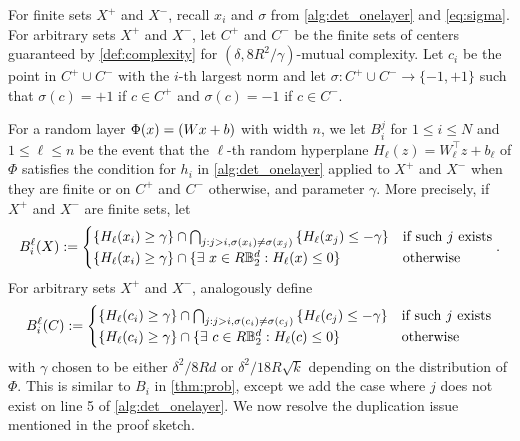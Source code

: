 \documentclass[aoap]{imsart}
\numberwithin{equation}{section}
\theoremstyle{definition}
\theoremstyle{remark}
\numberwithin{equation}{section}
\newcommand{\0}{\mathbf{0}}
\newcommand{\1}{\mathbf{1}}
\newcommand{\B}{\mathbb{B}}
\let \Re \relax
\DeclareMathOperator{\Re}{ReLU}
\numberwithin{equation}{section}
\begin{document}
For finite sets $X^+$ and $X^-$, recall $x_i$ and $\sigma$ from \cref{alg:det_onelayer} and \eqref{eq:sigma}. For arbitrary sets $X^+$ and $X^-$, let $C^{+}$ and $C^{-}$ be the finite sets of centers guaranteed by \cref{def:complexity} for  $(\delta, 8R^2/\gamma)$-mutual complexity. Let $c_{i}$ be the point in $C^{+}\cup C^{-}$ with the $i$-th largest norm and let $\sigma : C^{+}\cup C^{-}\to \lbrace -1, +1\rbrace$ such that $\sigma (c)=+1$ if $c\in C^{+}$ and $\sigma (c)=-1$ if $c\in C^{-}$.

For a random layer $\Phi(x)=\Re (Wx+b)$ with width $n$, we let $B_i^j$ for $1\leq i\leq N$ and $1\leq \ell\leq n$ be the event that the $\ell$-th random hyperplane $H_\ell(z)=W_\ell^{\intercal}z+b_\ell$ of $\Phi$ satisfies the condition for $h_i$ in \cref{alg:det_onelayer} applied to $X^+$ and $X^-$ when they are finite or on $C^+$ and $C^-$ otherwise, and parameter $\gamma$. More precisely, if $X^+$ and $X^-$ are finite sets, let
\begin{equation}\label{eq:bxil}
B^{\ell}_{i}(X):=\begin{cases}
\left\lbrace H_{\ell}(x_{i})\geq \gamma \right\rbrace\cap \bigcap_{j:j>i, \sigma(x_i) \neq\sigma(x_j)  }\left\lbrace H_{\ell}(x_{j})\leq -\gamma \right\rbrace & \textup{if such $j$ exists} \\
\left\lbrace H_{\ell}(x_{i})\geq \gamma \right\rbrace \cap \lbrace\exists \ x\in R\B_2^d: H_\ell(x)\leq 0\rbrace &\textup{otherwise}
\end{cases}.
\end{equation}
For arbitrary sets $X^+$ and $X^-$, analogously define
\begin{equation}\label{eq:bcil}
B^{\ell}_{i}(C):=\begin{cases}
\left\lbrace H_{\ell}(c_{i})\geq \gamma \right\rbrace\cap \bigcap_{j:j>i, \sigma(c_i) \neq\sigma(c_j)  }\left\lbrace H_{\ell}(c_{j})\leq -\gamma \right\rbrace & \textup{if such $j$ exists} \\
\left\lbrace H_{\ell}(c_{i})\geq \gamma \right\rbrace \cap \lbrace\exists \ c\in R\B_2^d: H_\ell(c)\leq 0\rbrace &\textup{otherwise}
\end{cases}
\end{equation}
with $\gamma$ chosen to be either $\delta^2/8Rd$ or $\delta^2/18R\sqrt{k}$ depending on the distribution of $\Phi$. This is similar to $B_i$ in \cref{thm:prob}, except we add the case where $j$ does not exist on line 5 of \cref{alg:det_onelayer}. We now resolve the duplication issue mentioned in the proof sketch.
\end{document}
